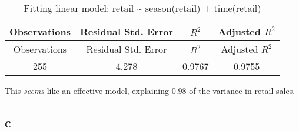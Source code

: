 \documentclass[]{book}
\theoremstyle{definition}
\theoremstyle{definition}
\theoremstyle{remark}
\begin{document}
\begin{longtable}[c]{@{}cccc@{}}
\caption{Fitting linear model: retail \textasciitilde{} season(retail) +
time(retail)}\tabularnewline
\toprule
\begin{minipage}[b]{0.18\columnwidth}\centering\strut
Observations
\strut\end{minipage} &
\begin{minipage}[b]{0.27\columnwidth}\centering\strut
Residual Std. Error
\strut\end{minipage} &
\begin{minipage}[b]{0.10\columnwidth}\centering\strut
\(R^2\)
\strut\end{minipage} &
\begin{minipage}[b]{0.20\columnwidth}\centering\strut
Adjusted \(R^2\)
\strut\end{minipage}\tabularnewline
\midrule
\endfirsthead
\toprule
\begin{minipage}[b]{0.18\columnwidth}\centering\strut
Observations
\strut\end{minipage} &
\begin{minipage}[b]{0.27\columnwidth}\centering\strut
Residual Std. Error
\strut\end{minipage} &
\begin{minipage}[b]{0.10\columnwidth}\centering\strut
\(R^2\)
\strut\end{minipage} &
\begin{minipage}[b]{0.20\columnwidth}\centering\strut
Adjusted \(R^2\)
\strut\end{minipage}\tabularnewline
\midrule
\endhead
\begin{minipage}[t]{0.18\columnwidth}\centering\strut
255
\strut\end{minipage} &
\begin{minipage}[t]{0.27\columnwidth}\centering\strut
4.278
\strut\end{minipage} &
\begin{minipage}[t]{0.10\columnwidth}\centering\strut
0.9767
\strut\end{minipage} &
\begin{minipage}[t]{0.20\columnwidth}\centering\strut
0.9755
\strut\end{minipage}\tabularnewline
\bottomrule
\end{longtable}

This \emph{seems} like an effective model, explaining 0.98 of the
variance in retail sales.

\subsection*{c}\label{c-14}
\end{document}
